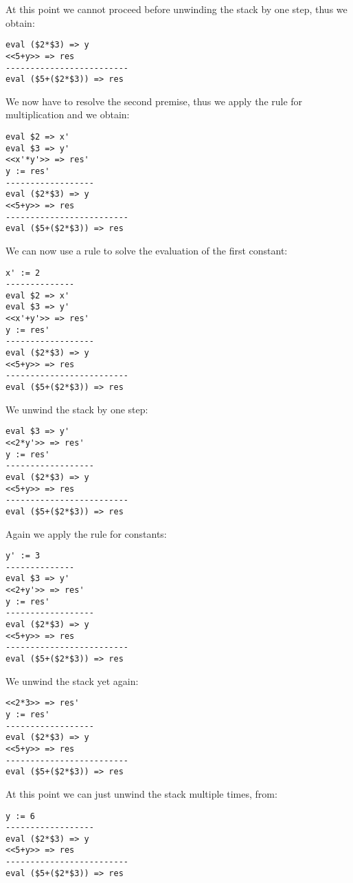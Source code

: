 At this point we cannot proceed before unwinding the stack by one step, thus we obtain:

\begin{lstlisting}
eval ($2*$3) => y
<<5+y>> => res
-------------------------
eval ($5+($2*$3)) => res
\end{lstlisting}

We now have to resolve the second premise, thus we apply the rule for multiplication and we obtain:

\begin{lstlisting}
eval $2 => x'
eval $3 => y'
<<x'*y'>> => res'
y := res'
------------------
eval ($2*$3) => y
<<5+y>> => res
-------------------------
eval ($5+($2*$3)) => res
\end{lstlisting}

We can now use a rule to solve the evaluation of the first constant:

\begin{lstlisting}
x' := 2
--------------
eval $2 => x'
eval $3 => y'
<<x'+y'>> => res'
y := res'
------------------
eval ($2*$3) => y
<<5+y>> => res
-------------------------
eval ($5+($2*$3)) => res
\end{lstlisting}

We unwind the stack by one step:

\begin{lstlisting}
eval $3 => y'
<<2*y'>> => res'
y := res'
------------------
eval ($2*$3) => y
<<5+y>> => res
-------------------------
eval ($5+($2*$3)) => res
\end{lstlisting}

Again we apply the rule for constants:

\begin{lstlisting}
y' := 3
--------------
eval $3 => y'
<<2+y'>> => res'
y := res'
------------------
eval ($2*$3) => y
<<5+y>> => res
-------------------------
eval ($5+($2*$3)) => res
\end{lstlisting}

We unwind the stack yet again:

\begin{lstlisting}
<<2*3>> => res'
y := res'
------------------
eval ($2*$3) => y
<<5+y>> => res
-------------------------
eval ($5+($2*$3)) => res
\end{lstlisting}

At this point we can just unwind the stack multiple times, from:

\begin{lstlisting}
y := 6
------------------
eval ($2*$3) => y
<<5+y>> => res
-------------------------
eval ($5+($2*$3)) => res
\end{lstlisting}

